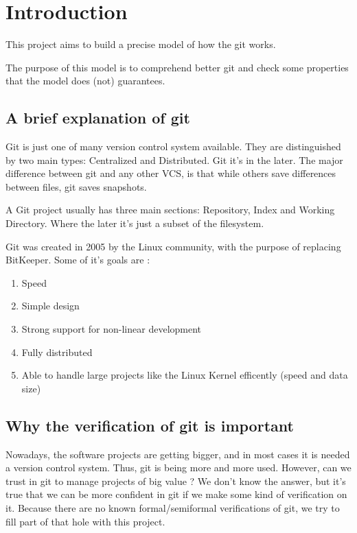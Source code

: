 \section{Introduction}

This project aims to build a precise model of how the git works. \par
The purpose of this model is to comprehend better git and 
check some properties that the model does
(not) guarantees.\par

\subsection{A brief explanation of git}

Git is just one of many \Gls{version control system} available. 
They are 
distinguished by two main types: Centralized and Distributed.
Git it's in the later. The major difference between git and any
other VCS, is that while others save differences between files, git saves
snapshots. \par
A Git project usually has three main sections: Repository, Index and
Working Directory. Where the later it's just a subset of the filesystem. \par
Git was created in 2005 by the Linux community, 
with the purpose of replacing BitKeeper. Some of it's
goals are \cite{progit}: 

\begin{enumerate}
	\item Speed
	\item Simple design
	\item Strong support for non-linear development
	\item Fully distributed
	\item Able to handle large projects like the Linux Kernel 
	efficently (speed and data size)
\end{enumerate}

\subsection{Why the verification of git is important}

Nowadays, the software projects are getting bigger, and in most
cases it is needed a version control system. Thus, git is being
more and more used. However, can we trust in git to manage projects
of big value ? We don't know the answer, but it's true that we can be
more confident in git if we make some kind of verification on it. Because
there are no known formal/semiformal verifications of git, we try to fill
part of that hole with this project.

